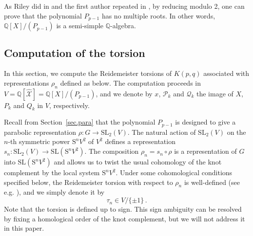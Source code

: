 \documentclass{amsart}
\newcommand{\Q}{\mathbb{Q}}
\newcommand{\SL}{\mathrm{SL}}
\newcommand{\calX}{\mathcal{X}}
\renewcommand{\S}{\mathrm{S}}
\DeclareMathOperator{\Tr}{Tr}
\def\calP{\mathcal{P}}
\def\calQ{\mathcal{Q}}
\theoremstyle{definition}
\begin{document}

As Riley did in \cite{Riley} and the first author repeated in \cite{S2P}, by reducing modulo 2, one can prove that the polynomial $P_{p-1}$ has no multiple roots. In other words, $\Q[X]/(P_{p-1})$ is a semi-simple $\Q$-algebra.

\subsection{Computation of the torsion}

In this section, we compute the Reidemeister torsions of $K(p,q)$ associated with representations $\rho_n$ defined as below. The computation proceeds in $V=\Q[\hat{\calX}]=\Q[X]/(P_{p-1})$, and we denote by $x$, $\calP_k$ and $\calQ_k$ the image of $X$, $P_k$ and $Q_k$ in $V$, respectively.

Recall from Section~\ref{sec.para} that the polynomial $P_{p-1}$ is designed to give a parabolic representation $\rho : G \rightarrow \SL_2(V)$.
The natural action of $\SL_2(V)$ on the $n$-th symmetric power $\S^nV^2$ of $V^2$ defines a representation $s_n:\SL_2(V)\to \SL(\S^nV^2)$. The composition $\rho_n = s_n \circ \rho$ is a representation of $G$ into $\SL(\S^nV^2)$ and allows us to twist the usual cohomology of the knot complement  by the local system $\S^n V^2$. Under some cohomological conditions specified below, the Reidemeister torsion with respect to $\rho_n$ is well-defined (see e.g. \cite{Porti}), and we simply denote it by
\begin{equation*}
    \tau_n \in V / \{\pm1\} \,. 
\end{equation*}
Note that the torsion is defined up to sign. This sign ambiguity can be resolved by fixing a homological order of the knot complement, but we will not address it in this paper.
\end{document}
